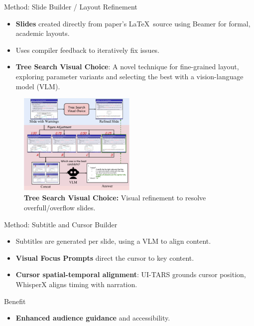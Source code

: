 \documentclass{beamer}
\newcommand{\alertterm}[1]{\alert{\textbf{#1}}}
\begin{document}
\begin{frame}{Method: Slide Builder / Layout Refinement}
  \begin{itemize}
    \item \alertterm{Slides} created directly from paper's \LaTeX~source using Beamer for formal, academic layouts.
    \item Uses compiler feedback to iteratively fix issues.
    \item \alertterm{Tree Search Visual Choice}: A novel technique for fine-grained layout, exploring parameter variants and selecting the best with a vision-language model (VLM).
  \end{itemize}
  \begin{figure}
    \includegraphics[width=0.5\textwidth]{figure/tree_search.pdf}
    \caption{\alertterm{Tree Search Visual Choice:} Visual refinement to resolve overfull/overflow slides.}
    \label{fig:mcts}
  \end{figure}
\end{frame}
\begin{frame}{Method: Subtitle and Cursor Builder}
  \begin{itemize}
    \item Subtitles are generated per slide, using a VLM to align content.
    \item \alertterm{Visual Focus Prompts} direct the cursor to key content.
    \item \alertterm{Cursor spatial-temporal alignment}: UI-TARS grounds cursor position, WhisperX aligns timing with narration.
  \end{itemize}
  \begin{block}{Benefit}
    \footnotesize
    \begin{itemize}
      \item \alertterm{Enhanced audience guidance} and accessibility.
    \end{itemize}
  \end{block}
\end{frame}
\end{document}
